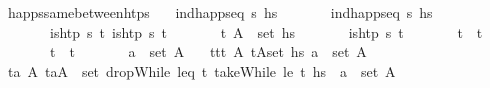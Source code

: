 \begin{isabellebody}
%
\isadelimproof
\isanewline
%
\endisadelimproof
\isanewline
{}\isamarkupfalse%
\ happs{\isacharunderscore}{\kern0pt}same{\isacharunderscore}{\kern0pt}between{\isacharunderscore}{\kern0pt}htps{\isacharcolon}{\kern0pt}\isanewline
\ \ \ {\isachardoublequoteopen}ind{\isacharunderscore}{\kern0pt}happ{\isacharunderscore}{\kern0pt}seq\ {\isasympi}s\ hs{\isachardoublequoteclose}\isanewline
\ \ \ \ \ \ \ {\isachardoublequoteopen}ind{\isacharunderscore}{\kern0pt}happ{\isacharunderscore}{\kern0pt}seq\ {\isasympi}s\ hs{\isacharprime}{\kern0pt}{\isachardoublequoteclose}\isanewline
\ \ \ \ \ \ \ {\isachardoublequoteopen}is{\isacharunderscore}{\kern0pt}htp\ {\isasympi}s\ t\ {\isachardoublequoteopen}is{\isacharunderscore}{\kern0pt}htp\ {\isasympi}s\ t\isanewline
\ \ \ \ \ \ \ {\isachardoublequoteopen}{\isacharparenleft}{\kern0pt}t{\isacharcomma}{\kern0pt}\ A{\isacharparenright}{\kern0pt}\ {\isasymin}\ set\ hs{\isachardoublequoteclose}\isanewline
\ \ \ \ \ \ \ {\isachardoublequoteopen}{\isasymnot}is{\isacharunderscore}{\kern0pt}htp\ {\isasympi}s\ t{\isachardoublequoteclose}\isanewline
\ \ \ \ \ \ \ {\isachardoublequoteopen}t\ {\isacharless}{\kern0pt}\ t{\isachardoublequoteclose}\isanewline
\ \ \ \ \ \ \ {\isachardoublequoteopen}t\ {\isacharless}{\kern0pt}\ t\isanewline
\ \ \ \ \ \ \ {\isachardoublequoteopen}a\ {\isasymin}\ set\ A{\isachardoublequoteclose}\isanewline
\ \ \ {\isachardoublequoteopen}{\isasymexists}t{\isacharprime}{\kern0pt}{\isasymin}{\isacharbraceleft}{\kern0pt}tt\ {\isasymexists}A{\isacharprime}{\kern0pt}{\isachardot}{\kern0pt}\ {\isacharparenleft}{\kern0pt}t{\isacharprime}{\kern0pt}{\isacharcomma}{\kern0pt}A{\isacharprime}{\kern0pt}{\isacharparenright}{\kern0pt}{\isasymin}set\ hs{\isacharprime}{\kern0pt}{\isasymand}\ a\ {\isasymin}\ set\ A{\isacharprime}{\kern0pt}{\isachardoublequoteclose}\isanewline
%
\isadelimproof
%
\endisadelimproof
%
\isatagproof
{}\isamarkupfalse%
{\isacharminus}{\kern0pt}\isanewline
\ \ \isamarkupfalse%
\ {\isachardoublequoteopen}{\isasymexists}t\isactrlsub a{\isacharprime}{\kern0pt}\ A{\isacharprime}{\kern0pt}{\isachardot}{\kern0pt}\ {\isacharparenleft}{\kern0pt}t\isactrlsub a{\isacharprime}{\kern0pt}{\isacharcomma}{\kern0pt}A{\isacharprime}{\kern0pt}{\isacharparenright}{\kern0pt}\ {\isasymin}\ set\ {\isacharparenleft}{\kern0pt}dropWhile\ {\isacharparenleft}{\kern0pt}leq\ t\ {\isacharparenleft}{\kern0pt}takeWhile\ {\isacharparenleft}{\kern0pt}le\ t\ hs{\isacharprime}{\kern0pt}{\isacharparenright}{\kern0pt}{\isacharparenright}{\kern0pt}\ {\isasymand}\ a\ {\isasymin}\ set\ A{\isacharprime}{\kern0pt}{\isachardoublequoteclose}\isanewline

\end{isabellebody}
